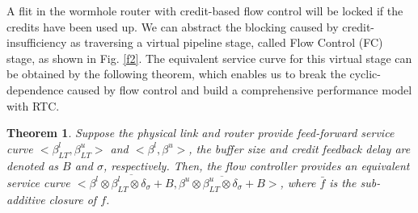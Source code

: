\documentclass[preprint]{elsarticle}
\newtheorem{thm}{Theorem}
\begin{document}
A flit in the wormhole router with credit-based flow control will be locked if the credits have been used up. We can abstract the blocking caused by credit-insufficiency as traversing a virtual pipeline stage, called Flow Control (FC) stage, as shown in Fig. \ref{f2}. The equivalent service curve for this virtual stage can be obtained by the following theorem, which enables us to break the cyclic-dependence caused by flow control and build a comprehensive performance model with RTC.
\begin{thm}\label{credit}
Suppose the physical link and router provide feed-forward service curve $<\beta_{LT}^l,\beta_{LT}^u>$ and $<\beta^l,\beta^u>$, the buffer size and credit feedback delay are denoted as $B$ and $\sigma$, respectively. Then, the flow controller provides an equivalent service curve $<\overline{\beta^l\otimes\beta_{LT}^l\otimes\delta_{\sigma}+B},\overline{\beta^u\otimes\beta_{LT}^u\otimes\delta_{\sigma}+B}>$, where $\bar{f}$ is the sub-additive closure \cite{Boudec2001Network} of $f$.
\end{thm}
\end{document}
